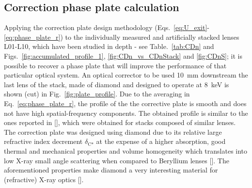 \begin{refsection}

\subsection{Correction phase plate calculation}\label{sec:cpp_calculation}

Applying the correction plate design methodology (Eqs.~\ref{eq:U_exit}-\ref{eq:phase_plate_r}) to the individually measured and artificially stacked lenses L01-L10, which have been studied in depth - see Table.~\ref{tab:CDn} and Figs.~\ref{fig:accumulated_profile_1}, \ref{fig:CDn_vs_CDnStack} and \ref{fig:CDnS}; it is possible to recover a phase plate that will improve the performance of that particular optical system. An optical corrector to be used 10~mm downstream the last lens of the stack, made of diamond and designed to operate at 8~keV is shown (cut) in Fig.~\ref{fig:plate_profile}. Due to the averaging in Eq.~\ref{eq:phase_plate_r}, the profile of the the corrective plate is smooth and does not have high spatial-frequency components. The obtained profile is similar to the ones reported in [\cite{Seiboth2017,Seiboth2018,Seiboth2020}], which were obtained for stacks composed of similar lenses. The correction plate was designed using diamond due to its relative large refractive index decrement $\delta_\text{C*}$ at the expense of a higher absorption, good thermal and mechanical properties and volume homogeneity which translates into low X-ray small angle scattering when compared to Beryllium lenses [\cite{Chubar2020}]. The aforementioned properties make diamond a very interesting material for (refractive) X-ray optics [\cite{Polikarpov2016b,ShvydKo2017}].


\end{refsection}
